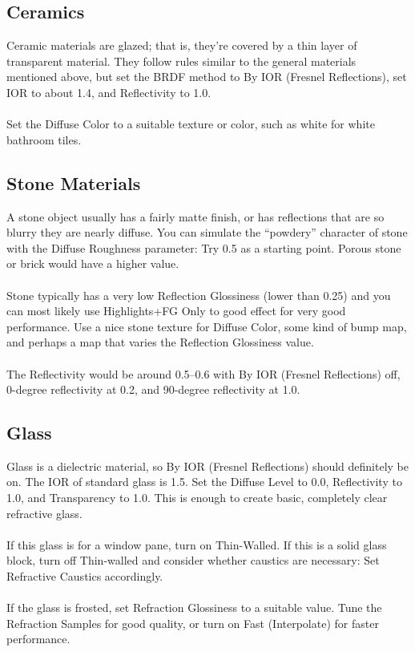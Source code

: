 \documentclass[10pt,a4paper]{article}
\begin{document}
\subsection{Ceramics}
Ceramic materials are glazed; that is, they're covered by a thin layer of transparent material. 
They follow rules similar to the general materials mentioned above, 
but set the BRDF method to By IOR (Fresnel Reflections), set IOR to about 1.4, and Reflectivity to 1.0.
\\
\\
Set the Diffuse Color to a suitable texture or color, such as white for white bathroom tiles.

\subsection{Stone Materials}
A stone object usually has a fairly matte finish, or has reflections that are so blurry they are nearly diffuse. 
You can simulate the “powdery” character of stone with the Diffuse Roughness parameter: Try 0.5 as a starting point. Porous stone or brick would have a higher value.
\\
\\
Stone typically has a very low Reflection Glossiness (lower than 0.25) and you can most likely use Highlights+FG Only to good effect for very good performance. 
Use a nice stone texture for Diffuse Color, some kind of bump map, and perhaps a map that varies the Reflection Glossiness value.
\\
\\
The Reflectivity would be around 0.5–0.6 with By IOR (Fresnel Reflections) off, 0-degree reflectivity at 0.2, and 90-degree reflectivity at 1.0.

\subsection{Glass}
Glass is a dielectric material, so By IOR (Fresnel Reflections) should definitely be on. 
The IOR of standard glass is 1.5. Set the Diffuse Level to 0.0, Reflectivity to 1.0, and Transparency to 1.0. 
This is enough to create basic, completely clear refractive glass.
\\
\\
If this glass is for a window pane, turn on Thin-Walled. If this is a solid glass block, turn off Thin-walled and consider whether caustics are necessary: Set Refractive Caustics accordingly.
\\
\\
If the glass is frosted, set Refraction Glossiness to a suitable value. Tune the Refraction Samples for good quality, or turn on Fast (Interpolate) for faster performance.
\\
\\
\end{document}
